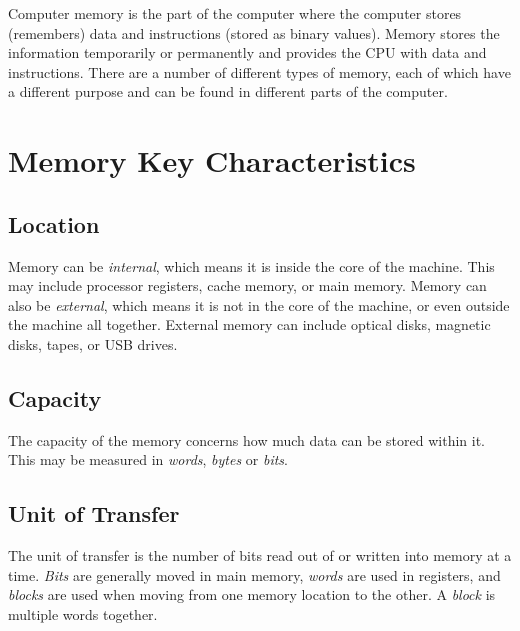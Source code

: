 
Computer memory is the part of the computer where the computer stores (remembers) data and instructions (stored as binary values). Memory stores the information temporarily or permanently and provides the CPU with data and instructions. There are a number of different types of memory, each of which have a different purpose and can be found in different parts of the computer.

\section{Memory Key Characteristics}
\subsection{Location}
Memory can be \textit{internal}, which means it is inside the core of the machine. This may include processor registers, cache memory, or main memory. Memory can also be \textit{external}, which means it is not in the core of the machine, or even outside the machine all together. External memory can include optical disks, magnetic disks, tapes, or USB drives.
\subsection{Capacity}
The capacity of the memory concerns how much data can be stored within it. This may be measured in \textit{words}, \textit{bytes} or \textit{bits}.
\subsection{Unit of Transfer}
The unit of transfer is the number of bits read out of or written into memory at a time. \textit{Bits} are generally moved in main memory, \textit{words} are used in registers, and \textit{blocks} are used when moving from one memory location to the other. A \textit{block} is multiple words together. 
